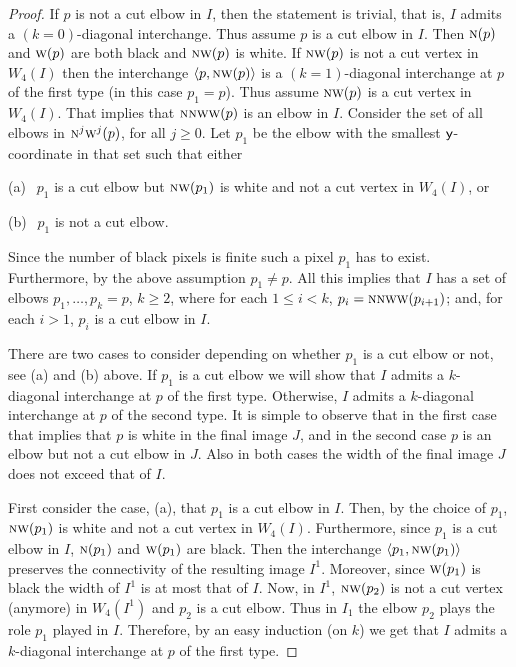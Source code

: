 \documentclass[lotsofwhite,charterfonts]{patmorin}
\newcommand{\N}{\textsc{n}}
\newcommand{\W}{\textsc{w}}
\newcommand{\NW}{\textsc{nw}}
\newcommand{\y}{\ensuremath{\protect\textup{\textsf{y}}}}
\newcommand{\ic}[2]{\langle #1,#2 \rangle}
\begin{document}
\begin{proof}
If $p$ is not a cut elbow in $I$, then the statement is trivial, that
is, $I$ admits a $(k=0)$-diagonal interchange. Thus assume $p$ is a
cut elbow in $I$. Then $\N(p)$ and $\W(p)$ are both black and $\NW(p)$
is white. If $\NW(p)$ is not a cut vertex in $W_4(I)$ then the
interchange $\ic{p}{\NW(p)}$ is a $(k=1)$-diagonal interchange at $p$
of the first type (in this case $p_1=p$). Thus assume $\NW(p)$ is a
cut vertex in $W_4(I)$. That implies that $\N\NW\W(p)$ is an elbow in
$I$. Consider the set of all elbows in $\N^j\W^j(p)$, for all $j\geq
0$. Let $p_1$ be the elbow with the smallest \y-coordinate in that set
such that either 


(a)$\ \ $ $p_1$ is a cut elbow but $\NW(p_1)$ is white and not
a cut vertex in $W_4(I)$, or

(b)$\ \ $ $p_1$ is not a cut elbow. 


\noindent Since the
number of black pixels is finite such a pixel $p_1$ has to exist.
Furthermore, by the above assumption $p_1\not=p$. All this implies
that $I$ has a set of elbows $p_1,\dots, p_k=p$, $k\geq 2$, where for
each $1\leq i< k$, $p_i=\N\N\W\W(p_{i+1})$; and, for each $i>1$, $p_i$
is a cut elbow in $I$. 

There are two cases to consider depending on whether $p_1$ is a cut
elbow or not, see (a) and (b) above. If $p_1$ is a cut elbow we will show that $I$ admits a $k$-diagonal interchange at $p$ of the first type. Otherwise, $I$
admits a $k$-diagonal interchange at $p$ of the second type. It is
simple to observe that in the first case that implies that $p$ is
white in the final image $J$, and in the second case $p$ is an elbow
but not a cut elbow in $J$. Also in both cases the width of the final
image $J$ does not exceed that of $I$.

First consider the case, (a), that $p_1$ is a cut elbow in $I$. Then, by the
choice of $p_1$, $\NW(p_1)$ is white and not a cut vertex in $W_4(I)$.
Furthermore, since $p_1$ is a cut elbow in $I$, $\N(p_1)$ and
$\W(p_1)$ are black. Then the interchange $\ic{p_1}{\NW(p_1)}$
preserves the connectivity of the resulting image $I^1$. Moreover,
since $\W(p_1)$ is black the width of $I^1$ is at most that of $I$.
Now, in $I^1$, $\NW(p_2)$ is not a cut vertex (anymore) in $W_4(I^1)$
and $p_2$ is a cut elbow. Thus in $I_1$ the elbow $p_2$ plays the role
$p_1$ played in $I$. Therefore, by an easy induction (on $k$) we get
that $I$ admits a $k$-diagonal interchange at $p$ of the first type. 


\end{proof}
\end{document}
